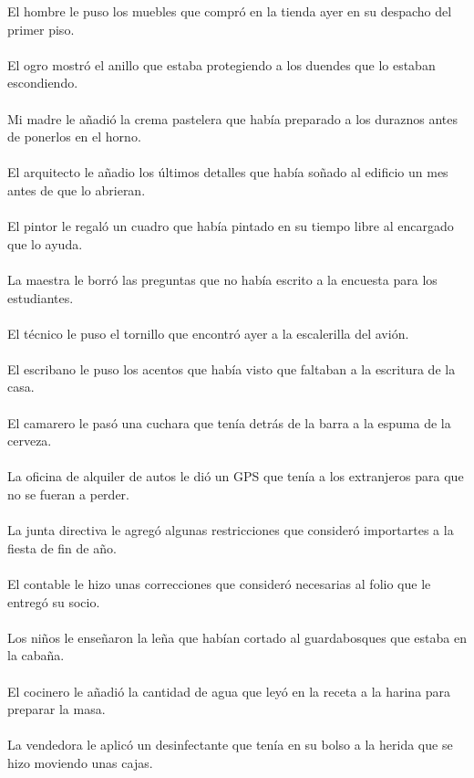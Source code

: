 El hombre le puso los muebles que compró en la tienda ayer en su despacho del primer piso.	\\	\\
El ogro mostró el anillo que estaba protegiendo a los duendes que lo estaban escondiendo.	\\	\\
Mi madre le añadió la crema pastelera que había preparado a los duraznos antes de ponerlos en el horno.	\\	\\
El arquitecto le añadio los últimos detalles que había soñado al edificio un mes antes de que lo abrieran.	\\	\\
El pintor le regaló un cuadro que había pintado en su tiempo libre al encargado que lo ayuda.	\\	\\
La maestra le borró las preguntas que no había escrito a la encuesta para los estudiantes.	\\	\\
El técnico le puso el tornillo que encontró ayer a la escalerilla del avión.	\\	\\
El escribano le puso los acentos que había visto que faltaban a la escritura de la casa.	\\	\\
El camarero le pasó una cuchara que tenía detrás de la barra a la espuma de la cerveza.	\\	\\
La oficina de alquiler de autos le dió un GPS que tenía a los extranjeros para que no se fueran a perder.	\\	\\
La junta directiva le agregó algunas restricciones que consideró importartes a la fiesta de fin de año.	\\	\\
El contable le hizo unas correcciones que consideró necesarias al folio que le entregó su socio.	\\	\\
Los niños le enseñaron la leña que habían cortado al guardabosques que estaba en la cabaña.	\\	\\
El cocinero le añadió la cantidad de agua que leyó en la receta a la harina para preparar la masa.	\\	\\
La vendedora le aplicó un desinfectante que tenía en su bolso a la herida que se hizo moviendo unas cajas.	\\	\\
